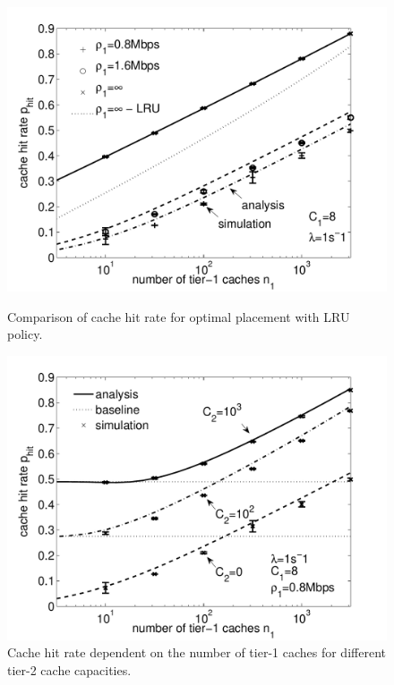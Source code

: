 \begin{figure}[bt]
\begin{minipage}[t]{0.49\textwidth}
  \centering
  \includegraphics[width=\textwidth]{hierarchical/analyticbw/figures/hwc_CISP0}
  \caption{Comparison of cache hit rate for optimal placement with LRU policy.}
  \label{fig:hwc_CISP0}
\end{minipage}
\hspace{0.01\textwidth}
\begin{minipage}[t]{0.49\textwidth}
  \centering
  \includegraphics[width=\textwidth]{hierarchical/analyticbw/figures/hwc_l1C8_C2}
  \caption{Cache hit rate dependent on the number of tier-1 caches for different tier-2 cache capacities.}
  \label{fig:hwc_l1C8_C2}
\end{minipage}
\end{figure}

